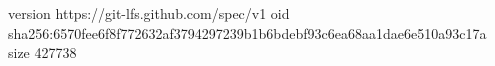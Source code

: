 version https://git-lfs.github.com/spec/v1
oid sha256:6570fee6f8f772632af3794297239b1b6bdebf93c6ea68aa1dae6e510a93c17a
size 427738
